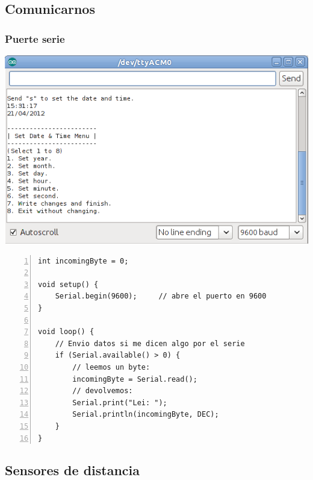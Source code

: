 \documentclass[compress]{beamer}
\begin{document}
\subsection{Comunicarnos}
\begin{frame}[fragile]
 \frametitle{Puerte serie}

\begin{center}
 \includegraphics[height=0.4\textheight]{./img/serial.png}
\end{center}

\begin{Verbatim}[formatcom=\color{red},fontseries=b, numbers=left,numbersep=3pt,fontsize=\tiny]
int incomingByte = 0;

void setup() {
    Serial.begin(9600);     // abre el puerto en 9600
}

void loop() {
    // Envio datos si me dicen algo por el serie
    if (Serial.available() > 0) {
        // leemos un byte:
        incomingByte = Serial.read();
        // devolvemos:
        Serial.print("Lei: ");
        Serial.println(incomingByte, DEC);
    }
}
\end{Verbatim}
\end{frame}

\subsection{Sensores de distancia}
\end{document}
